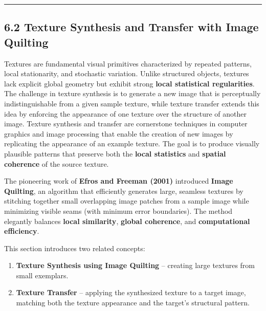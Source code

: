 \documentclass[11pt]{article}
\providecommand{\tightlist}{%
      \setlength{\itemsep}{0pt}\setlength{\parskip}{0pt}}
\begin{document}
\begin{center}\rule{0.5\linewidth}{0.5pt}\end{center}

\hypertarget{texture-synthesis-and-transfer-with-image-quilting}{%
\subsection{\texorpdfstring{\textbf{6.2 Texture Synthesis and Transfer
with Image
Quilting}}{6.2 Texture Synthesis and Transfer with Image Quilting}}\label{texture-synthesis-and-transfer-with-image-quilting}}

Textures are fundamental visual primitives characterized by repeated
patterns, local stationarity, and stochastic variation. Unlike
structured objects, textures lack explicit global geometry but exhibit
strong \textbf{local statistical regularities}. The challenge in texture
synthesis is to generate a new image that is perceptually
indistinguishable from a given sample texture, while texture transfer
extends this idea by enforcing the appearance of one texture over the
structure of another image. Texture synthesis and transfer are
cornerstone techniques in computer graphics and image processing that
enable the creation of new images by replicating the appearance of an
example texture. The goal is to produce visually plausible patterns that
preserve both the \textbf{local statistics} and \textbf{spatial
coherence} of the source texture.

The pioneering work of \textbf{Efros and Freeman (2001)} introduced
\textbf{Image Quilting}, an algorithm that efficiently generates large,
seamless textures by stitching together small overlapping image patches
from a sample image while minimizing visible seams (with minimum error
boundaries). The method elegantly balances \textbf{local similarity},
\textbf{global coherence}, and \textbf{computational efficiency}.

This section introduces two related concepts:

\begin{enumerate}
\def\labelenumi{\arabic{enumi}.}
\tightlist
\item
  \textbf{Texture Synthesis using Image Quilting} -- creating large
  textures from small exemplars.
\item
  \textbf{Texture Transfer} -- applying the synthesized texture to a
  target image, matching both the texture appearance and the target's
  structural pattern.
\end{enumerate}
\end{document}
